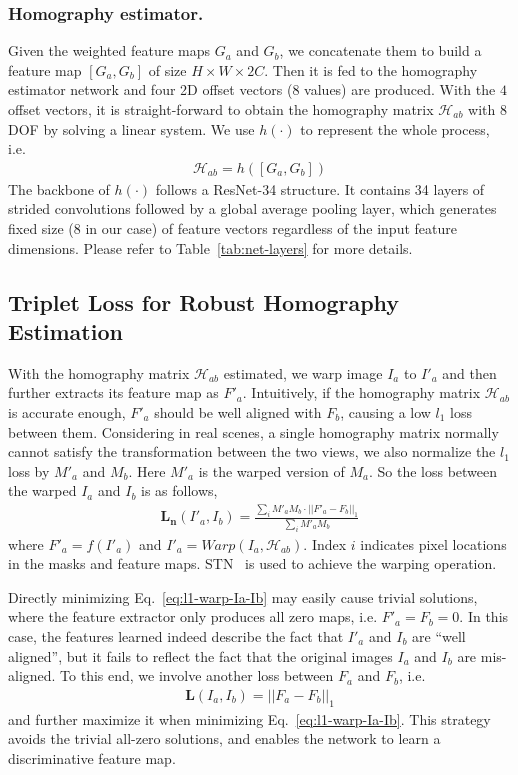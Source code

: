 \documentclass[runningheads]{llncs}
\begin{document}
\subsubsection{Homography estimator.}
Given the weighted feature maps $G_a$ and $G_b$, we concatenate them to build a feature map $[G_a, G_b]$ of size $H\times W\times 2C$. Then it is fed to the homography estimator network and four 2D offset vectors (8 values) are produced. With the $4$ offset vectors, it is straight-forward to obtain the homography matrix $\mathcal{H}_{ab}$ with 8 DOF by solving a linear system. We use $h(\cdot)$ to represent the whole process, i.e.
\begin{align}
\mathcal{H}_{ab} = h([G_a, G_b])
\end{align}
The backbone of $h(\cdot)$ follows a ResNet-34 structure. It contains 34 layers of strided convolutions followed by a global average pooling layer, which generates fixed size (8 in our case) of feature vectors regardless of the input feature dimensions. Please refer to Table~\ref{tab:net-layers} for more details. 

\subsection{Triplet Loss for Robust Homography Estimation}\label{subsec:triplet-loss}With the homography matrix $\mathcal{H}_{ab}$ estimated, we warp image $I_a$ to $I'_a$ and then further extracts its feature map as $F'_a$. Intuitively, if the homography matrix $\mathcal{H}_{ab}$ is accurate enough, $F'_a$ should be well aligned with $F_b$, causing a low $l_1$ loss between them. Considering in real scenes, a single homography matrix normally cannot satisfy the transformation between the two views, we also normalize the $l_1$ loss by $M'_a$ and $M_b$. Here $M'_a$ is the warped version of $M_a$. So the loss between the warped $I_a$ and $I_b$ is as follows,
\begin{align}
\mathbf{L_n}(I'_a, I_b) = \frac{\sum_i M'_aM_b\cdot||F'_a - F_b||_1}{\sum_i M'_aM_b} \label{eq:l1-warp-Ia-Ib}
\end{align}
where $F'_a = f(I'_a)$ and $I'_a = Warp(I_a, \mathcal{H}_{ab})$. Index $i$ indicates pixel locations in the masks and feature maps. STN~\cite{jaderberg2015spatial} is used to achieve the warping operation.

Directly minimizing Eq.~\ref{eq:l1-warp-Ia-Ib} may easily cause trivial solutions, where the feature extractor only produces all zero maps, i.e. $F'_a = F_b = 0$. In this case, the features learned indeed describe the fact that $I'_a$ and $I_b$ are ``well aligned'', but it fails to reflect the fact that the original images $I_a$ and $I_b$ are mis-aligned. To this end, we involve another loss between $F_a$ and $F_b$, i.e.
\begin{align}
\mathbf{L}(I_a, I_b) = ||F_a - F_b||_1 \label{eq:l1-Ia-Ib}
\end{align}
and further maximize it when minimizing Eq.~\ref{eq:l1-warp-Ia-Ib}. This strategy avoids the trivial all-zero solutions, and enables the network to learn a discriminative feature map.
\end{document}
